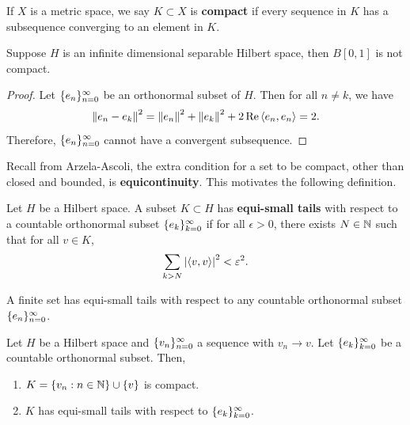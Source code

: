 \documentclass[a4paper]{article}
\renewcommand{\braket}[2]{\left\langle #1, #1 \right\rangle}
\begin{document}
\begin{defi}[Compact]
If $X$ is a metric space, we say $K \subset X$ 
is \textbf{compact} if every sequence in $K$ 
has a subsequence converging to an element in $K$.
\end{defi}

\begin{eg}
Suppose $H$ is an infinite dimensional separable 
Hilbert space, then $B[0, 1]$ is not compact.
\end{eg}

\begin{proof}
  Let $\{ e_n \}_{n=0}^\infty$ be an orthonormal subset of $H$. 
  Then for all $n \neq k$, we have 
  \[
  \norm{e_n - e_k}^2 = \norm{e_n}^2 + \norm{e_k}^2 
  + 2 \Re \braket{e_n}{e_k} = 2.
  \]
  Therefore, $\{ e_n \}_{n=0}^\infty$ cannot have a convergent 
  subsequence.
\end{proof}

Recall from Arzela-Ascoli, the extra condition for a 
set to be compact, other than closed and bounded,
is \textbf{equicontinuity}. 
This motivates the following definition. 

\begin{defi}
Let $H$ be a Hilbert space. A subset $K \subset H$ has 
\textbf{equi-small tails} with respect to a countable 
orthonormal subset $\{ e_k \}_{k=0}^\infty$ if for all 
$\epsilon > 0$, there exists $N \in \mathbb{N}$ such that 
for all $v \in K$, 
\[
\sum_{k > N} \abs{\braket{v}{e_k}}^2 < \epsilon^2.
\]
\end{defi}

\begin{eg}
A finite set has equi-small tails with respect to 
any countable orthonormal subset $\{ e_n \}_{n=0}^\infty$.
\end{eg}

\begin{thm}
Let $H$ be a Hilbert space and $\{ v_n \}_{n=0}^\infty$
a sequence with $v_n \to v$. Let $\{ e_k \}_{k=0}^\infty$
be a countable orthonormal subset. Then, 
\begin{enumerate}
  \item $K = \left\{ v_n : n \in \mathbb{N} \right\}
  \cup \left\{ v \right\}$ is compact. 
  
  \item $K$ has equi-small tails with respect to 
  $\{ e_k \}_{k=0}^\infty$.
\end{enumerate}
\end{thm}
\end{document}
